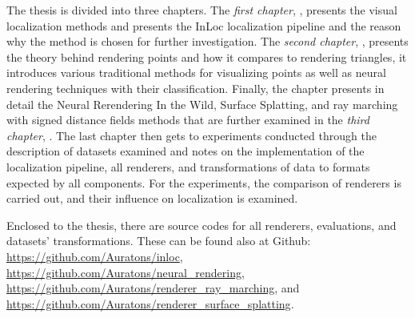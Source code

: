 The thesis is divided into three chapters. The \emph{first chapter},
, presents the visual localization
methods and presents the InLoc localization pipeline and the
reason why the method is chosen for further investigation.
The \emph{second chapter}, , presents
the theory behind rendering points and how it compares to
rendering triangles, it introduces various traditional methods
for visualizing points as well as neural rendering techniques
with their classification. Finally, the chapter presents in
detail the Neural Rerendering In the Wild, Surface Splatting,
and ray marching with signed distance fields methods that are
further examined in the \emph{third chapter},
. The last chapter then gets to
experiments conducted through the description of datasets examined
and notes on the implementation of the localization pipeline, all
renderers, and transformations of data to formats expected by
all components. For the experiments, the comparison of renderers is
carried out, and their influence on localization is examined.

Enclosed to the thesis, there are source codes for all renderers,
evaluations, and datasets' transformations. These can be found
also at Github: \url{https://github.com/Auratons/inloc},
\url{https://github.com/Auratons/neural_rendering},
\url{https://github.com/Auratons/renderer_ray_marching}, and
\url{https://github.com/Auratons/renderer_surface_splatting}.

